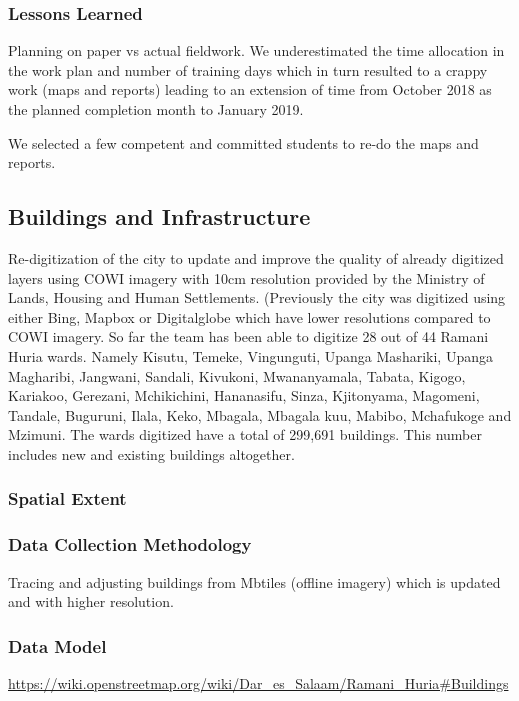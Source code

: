 \documentclass[a4paper,12pt,twoside]{article}
\begin{document}
\subsubsection{Lessons Learned}
Planning on paper vs actual fieldwork. We underestimated the time allocation in the work plan and number of training days which in turn resulted to a crappy work (maps and reports) leading to an  extension of time from October 2018 as the planned completion month to January 2019.

\medskip
We selected a few competent and committed students to re-do the maps and reports.


\newpage
\subsection{Buildings and Infrastructure}
\begin{multicols}{2}
Re-digitization of the city to update and improve the quality of already digitized layers using COWI imagery with 10cm resolution provided by the Ministry of Lands, Housing and Human Settlements. (Previously the city was digitized using either Bing, Mapbox or Digitalglobe which have lower resolutions compared to COWI imagery. So far the team has been able to digitize 28 out of 44 Ramani Huria wards. Namely Kisutu, Temeke, Vingunguti, Upanga Mashariki, Upanga Magharibi, Jangwani, Sandali, Kivukoni, Mwananyamala, Tabata, Kigogo, Kariakoo, Gerezani, Mchikichini, Hananasifu, Sinza, Kjitonyama, Magomeni, Tandale, Buguruni, Ilala, Keko, Mbagala, Mbagala kuu, Mabibo, Mchafukoge and Mzimuni. The wards digitized have a total of 299,691 buildings. This number includes new and existing buildings altogether.
\end{multicols}

\subsubsection{Spatial Extent}

\subsubsection{Data Collection Methodology}

Tracing and adjusting buildings from Mbtiles (offline imagery) which is updated and with higher resolution.

\subsubsection{Data Model}
\href{https://wiki.openstreetmap.org/wiki/Dar_es_Salaam/Ramani_Huria\#Buildings}{https://wiki.openstreetmap.org/wiki/Dar\_es\_Salaam/Ramani\_Huria\#Buildings}
\end{document}
